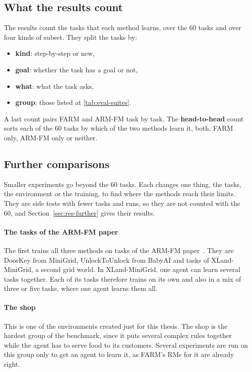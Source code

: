 \documentclass[11pt,english,listoffigures,listoftables]{tfgetsinf}
\begin{document}
\subsection{What the results count}
The results count the tasks that each method learns, over the 60 tasks and over four kinds of subset. They split the tasks by:
\begin{itemize}
    \item \textbf{kind}: step-by-step or new, 
    \item \textbf{goal}: whether the task has a goal or not, 
    \item \textbf{what}: what the task asks, 
    \item \textbf{group}: those listed at \ref{tab:eval-suites}.
\end{itemize} 
A last count pairs FARM and ARM-FM task by task. The \textbf{head-to-head} count sorts each of the 60 tasks by which of the two methods learn it, both, FARM only, ARM-FM only or neither.

\subsection{Further comparisons}
\label{sec:eval-armfm-paper}Smaller experiments go beyond the 60 tasks. Each changes one thing, the tasks, the environment or the training, to find where the methods reach their limits. They are side tests with fewer tasks and runs, so they are not counted with the 60, and Section~\ref{sec:res-further} gives their results.

\paragraph{The tasks of the ARM-FM paper} The first trains all three methods on tasks of the ARM-FM paper~\cite{creus2026armfm}. They are DoorKey from MiniGrid, UnlockToUnlock from BabyAI and tasks of XLand-MiniGrid, a second grid world. In XLand-MiniGrid, one agent can learn several tasks together. Each of its tasks therefore trains on its own and also in a mix of three or five tasks, where one agent learns them all.

\paragraph{The shop} This is one of the environments created just for this thesis. The shop is the hardest group of the benchmark, since it puts several complex rules together while the agent has to serve food to its customers. Several experiments are run on this group only to get an agent to learn it, as FARM's RMs for it are already right.
\end{document}
